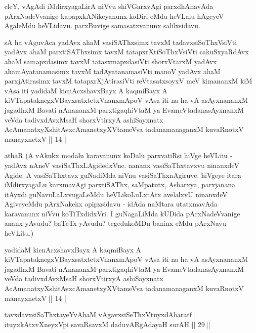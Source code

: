 \begin{artha}
eleY, vAgAdi iMdirxyagaLirA niVvu shiVGarxvAgi parxdhAnavAda 
pArxNadeVvanige kapapxkANikeyanunx koDiri eMdu heVLalu hAgeyeV AgaleMdu 
heVLidavu. parxBuvige samasatxvanunx salilxsidavu.
\end{artha}


\begin{kandikeshl}
sA ha vAguvAca yadAvx ahaM vasiSAThxsimx tavxM tadavxsiSoThxV\s siVti yadAvx ahaM parxtiSAThxsimx tavxM tatapxrXtiSoThxV\s siVti cakuSxyaRdAvx ahaM samapxdasimx tavxM tatasxmapxdasiVti shorxVtarxM yadAvx ahamAyatanamasimx tavxM tadAyatanamasiVti manoV yadAvx ahaM parxjAtirasimx tavxM tatapxrXjAtirasiVti reVtasatxsoyxV meV kimananxM kiM vAsa iti yadidaM kicnAcxshavxBayx A kaqmiBayx A kiVTapataknegxVBayxsatxtetxV\s nanxmApoV vAsa iti na ha vA asAyxnananxM jagadhxM Bavati nAnananxM parxtigaqhiVtaM ya EvameVtadanasAyxnanxM veVda tadivxdAvxMsaH shorxVtirxyA ashiSayxnatx AcAmanatxyXshitAvxcAmanetxyXVtameVva tadanamanaganxM kuvaRnotxV manayxnetxV || 14 ||
\end{kandikeshl}

\begin{artha}
athaR (A vAkukx modalu karavanunx koDalu parxvatiRsi hiVge heVLitu - 
yadAvx nAneV vasiSaThxLAgidedxVne. nananx vasiSaThxtavxvu ninanxdeV 
Agide. A vasiSaThxtavx guNadiMda niVnu vasiSaThxnAgiruve. hiVgeye 
itara iMdirxyagaLu karxmavAgi parxtiSAThx, saMpatutx, Asharxya, 
parxjanana itAyxdi guNavuLaLxvugaLeMdu heVLikoLuLxtAtx avelalxvU 
ninanxdeV AgiveyeMdu pArxNakekx opipxsidavu - idAda naMtara utatxmavAda 
karavanunx niVvu koTiTxdidxVri. I guNagaLiMda kUDida pArxNadeVvanige 
ananx yAvudu? baTeTx yAvudu? tegedukoMDu baninx eMdu pArxNavu heVLitu.)
\end{artha}

\begin{shl}
yadidaM kicnAcxshavxBayx A kaqmiBayx A kiVTapataknegxVBayxsatxtetxV\s nanxmApoV vAsa iti na ha vA asAyxnananxM jagadhxM Bavati nAnananxM parxtigaqhiVtaM ya EvameVtadanasAyxnanxM veVda tadivxdAvxMsaH shorxVtirxyA ashiSayxnatx AcAmanatxyXshitAvxcAmanetxyXVtameVva tadanamanaganxM kuvaRnotxV manayxnetxV || 14 ||
\end{shl}

\begin{shl}
tavxdavxsiSaThxtayeYvAhaM vAgavxsiSeThxVtuyxdAharatf | \\
ituyxkAtxvX\s neyxV\s pi savaRsavxM daduvARgAdayaH surAH \hfill|| 29 || 
\end{shl}

